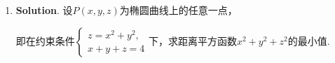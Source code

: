 \documentclass[../main.tex]{subfiles}
\begin{document}
\begin{enumerate}
          方程组$\begin{cases}
                  F(x,y,z) = x^{2}+y^{2}+z^{2}-4=0, \\
                  G(x,y,z)=(x-1)^{2}+y^{2}-1=0
              \end{cases}$两边对$x$求导，得
          \[
              \begin{cases}
                  2x+2y\frac{\mathrm{d}y}{\mathrm{d}x}+2z\frac{\mathrm{d}z}{\mathrm{d}x}= 0, \\[6pt]
                  2(x-1)+2y\frac{\mathrm{d}y}{\mathrm{d}x}= 0.
              \end{cases}
          \]
          解得$\begin{cases}
                  \frac{\mathrm{d}y}{\mathrm{d}x} = \frac{1-x}{y}, \\[6pt]
                  \frac{\mathrm{d}z}{\mathrm{d}x} = -\frac{1}{z}
              \end{cases}$，所以法平面的法向量可取为$\sqrt{2}\left(1,\frac{\mathrm{d}y}{\mathrm{d}x}
              ,\frac{\mathrm{d}z}{\mathrm{d}x}\right)_{P}=\left(\sqrt{2},0,-1\right)$，

          法平面的方程为$\sqrt{2}\cdot(x-1)-0\cdot(y-1)+(-1)\cdot(z-\sqrt{2})=0$，即$\sqrt{2}
              x-z=0$.

          \textbf{法二}. $\nabla F = (2x,2y,2z)$，$\nabla G = (2(x-1),2y,0)$，

          取两个曲面的法向量分别为$\boldsymbol{n}_{F}= \frac{1}{2}\nabla F|_{P}= \left
              (1,1,\sqrt{2}\right)$，$\boldsymbol{n}_{G}= \frac{1}{2}\nabla G|_{P}= (0,1,
              0)$，

          所以法平面的法向量可取为$\boldsymbol{n}_{F}\times \boldsymbol{n}_{G}=
              \begin{vmatrix}
                  \boldsymbol{i} & \boldsymbol{j} & \boldsymbol{k} \\
                  1              & 1              & \sqrt{2}       \\
                  0              & 1              & 0
              \end{vmatrix}
              = \left(-\sqrt{2},0,1\right)$，

          法平面的方程为$-\sqrt{2}\cdot(x-1)-0\cdot(y-1)+1\cdot(z-\sqrt{2})=0$，即$\sqrt{2}
              x-z=0$.

    \item \textbf{Solution}. 设$P(x,y,z)$为椭圆曲线上的任意一点，

          即在约束条件$\begin{cases}
                  z=x^{2}+y^{2}, \\
                  x+y+z=4
              \end{cases}$下，求距离平方函数$x^{2}+y^{2}+z^{2}$的最小值.


\end{enumerate}
\end{document}

